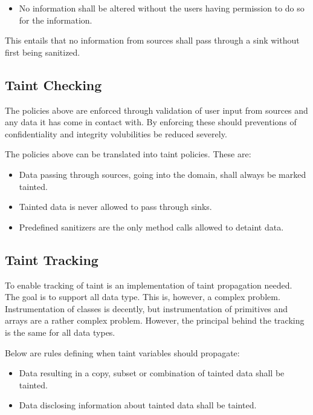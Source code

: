 \hfill
\begin{itemize}
    \item No information shall be altered without the users having permission to do so for the information.
\end{itemize}
\hfill

This entails that no information from sources shall pass through a sink without first being sanitized.



\subsection{Taint Checking}
The policies above are enforced through validation of user input from sources and any data it has come in contact with. By enforcing these should preventions of confidentiality and integrity volubilities be reduced severely.

The policies above can be translated into taint policies. These are:

\hfill
\begin{itemize}
    \item Data passing through sources, going into the domain, shall always be marked tainted.
    \item Tainted data is never allowed to pass through sinks.
    \item Predefined sanitizers are the only method calls allowed to detaint data.
\end{itemize}
\hfill



\subsection{Taint Tracking}
To enable tracking of taint is an implementation of taint propagation needed. The goal is to support all data type. This is, however, a complex problem. Instrumentation of classes is decently, but instrumentation of primitives and arrays are a rather complex problem. However, the principal behind the tracking is the same for all data types. 

Below are rules defining when taint variables should propagate:

\hfill
\begin{itemize}
    \item Data resulting in a copy, subset or combination of tainted data shall be tainted.
    \item Data disclosing information about tainted data shall be tainted.
\end{itemize}
\hfill



